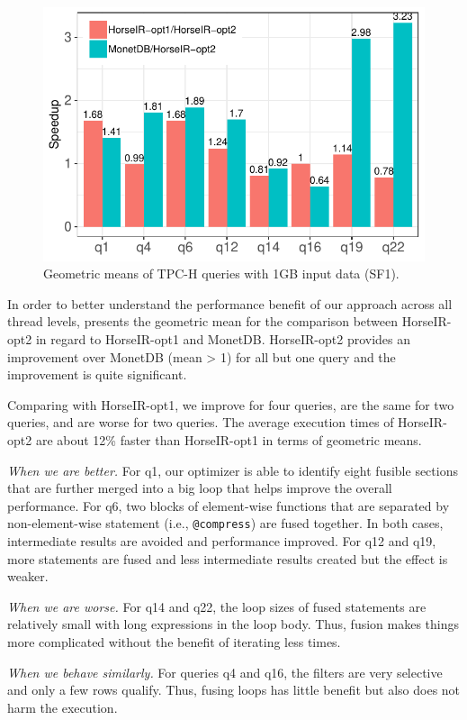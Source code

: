 \begin{figure}[htbp]
\centering
\includegraphics[width=.9\columnwidth]{./src/figure/sf1-speedup.pdf}
\caption{Geometric means of TPC-H queries with 1GB input data (SF1).}
\label{fig:tpch_sf1_speedup}
\end{figure}

In order to better understand the performance benefit of our approach across all thread levels, 
  presents  the geometric mean for the comparison
between HorseIR-opt2 in regard to HorseIR-opt1 and MonetDB. 
HorseIR-opt2 provides an improvement over MonetDB (mean > 1) for all but one
query and the improvement is quite significant. 

Comparing with HorseIR-opt1, we improve for four queries, are the same for two
queries, and are worse for two queries. The average execution times of
HorseIR-opt2 are about 12\% faster than HorseIR-opt1 in terms of geometric
means.

\textit{When we are better.}
For q1, our optimizer is able to identify eight fusible sections that are
further merged into a big loop that helps improve the overall performance.
For q6, two blocks of element-wise functions that are separated by
non-element-wise statement (i.e., \texttt{@compress}) are fused together. In
both cases, intermediate results are avoided and performance improved.
For q12 and q19, more statements are fused and less intermediate results
created but the effect is weaker.

\textit{When we are worse.}
For q14 and q22, the loop sizes of fused statements are relatively small with
long expressions in the loop body. Thus, fusion makes things more complicated
without the benefit of iterating less times. 

\textit{When we behave similarly.}
For queries q4 and q16, the filters are very selective and only a few rows
qualify. Thus, fusing loops has little benefit but also does not harm the
execution.

